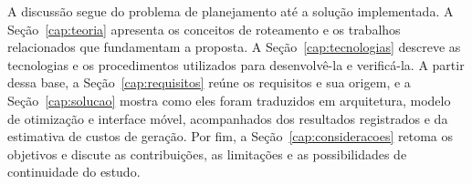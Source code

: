 A discussão segue do problema de planejamento até a solução implementada. A Seção~\ref{cap:teoria} apresenta os conceitos de roteamento e os trabalhos relacionados que fundamentam a proposta. A Seção~\ref{cap:tecnologias} descreve as tecnologias e os procedimentos utilizados para desenvolvê-la e verificá-la. A partir dessa base, a Seção~\ref{cap:requisitos} reúne os requisitos e sua origem, e a Seção~\ref{cap:solucao} mostra como eles foram traduzidos em arquitetura, modelo de otimização e interface móvel, acompanhados dos resultados registrados e da estimativa de custos de geração. Por fim, a Seção~\ref{cap:consideracoes} retoma os objetivos e discute as contribuições, as limitações e as possibilidades de continuidade do estudo.
